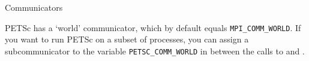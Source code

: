 
 {Communicators}

PETSc has a `world' communicator, which by default equals
\lstinline{MPI_COMM_WORLD}. If you want to run PETSc on a subset of processes,
you can assign a subcommunicator to the variable \lstinline{PETSC_COMM_WORLD}
in between the calls to  and
.
%
